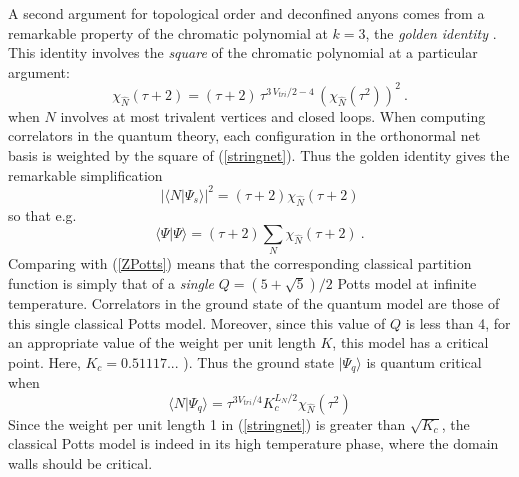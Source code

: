 \documentclass[11pt]{article}
\begin{document}
A second argument for topological order and deconfined anyons comes
from a remarkable property of the chromatic polynomial at $k=3$, the
{\em golden identity} \cite{Tutte,FKrush}. This identity involves the {\em square} of the chromatic polynomial at a particular argument:
\begin{equation}  
{\chi}_{\widehat N}({\tau}+2)=({\tau}+2)\, 
{\tau}^{3\,V_{tri}/2-4}\, ({\chi}_{\widehat N}(\tau^2))^2\ .
\label{golden}
\end{equation}
when $N$ involves at most trivalent vertices and closed loops.  
When computing correlators in the quantum theory, each configuration
in the orthonormal net basis is weighted by the square of
(\ref{stringnet}). Thus the golden identity gives the remarkable
simplification \cite{Fidkowski}
$$|\langle N|\Psi_s\rangle|^2 = (\tau+2) \chi_{\widehat{N}}(\tau+2)$$
so that e.g.\
$$\langle \Psi|\Psi \rangle = (\tau+2) \sum_N
\chi_{\widehat{N}}(\tau+2)\ .$$ Comparing with (\ref{ZPotts}) means
that the corresponding classical partition function is simply that of
a {\em single} $Q=(5+\sqrt{5})/2$ Potts model at infinite temperature.
Correlators in the ground state of the quantum model are those of this
single classical Potts model. Moreover, since this value of $Q$ is
less than 4, for an appropriate value of the weight per unit length
$K$, this model has a critical point. Here, $K_c= 0.51117...$ \cite{BTA}).
Thus the ground state $|\Psi_q\rangle$ is quantum critical when
\begin{equation}
\langle N|\Psi_q\rangle = \tau^{3V_{tri}/4} K_c^{L_N/2}\chi_{\widehat{N}}(\tau^2)
\label{qcp}
\end{equation}
Since the weight per unit length 1 in (\ref{stringnet}) is greater than
$\sqrt{K_c}$, the classical Potts model is indeed in its high temperature
phase, where the domain walls should be critical.
\end{document}
